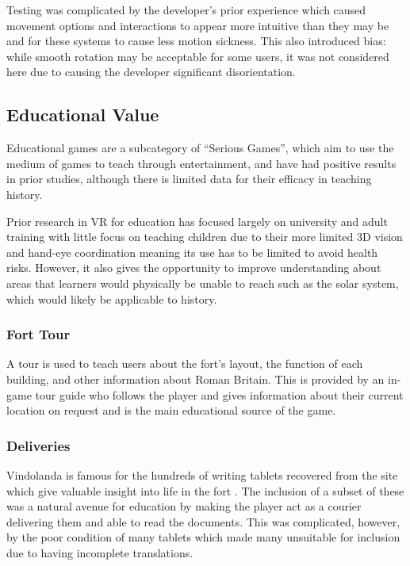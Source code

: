 \documentclass[sigconf]{acmart}
\begin{document}
Testing was complicated by the developer's prior experience which caused
movement options and interactions to appear more intuitive than they may be and
for these systems to cause less motion sickness. This also introduced bias:
while smooth rotation may be acceptable for some users, it was not considered
here due to causing the developer significant disorientation.


\subsection{Educational Value}
Educational games are a subcategory of ``Serious Games'', which aim to use the
medium of games to teach through entertainment, and have had positive results in
prior studies, although there is limited data for their efficacy in teaching
history. \cite{backlund_educational_2013}

Prior research in VR for education has focused largely on university and adult
training with little focus on teaching children due to their more limited 3D
vision and hand-eye coordination meaning its use has to be limited to avoid
health risks. \cite{freina_literature_2015} However, it
also gives the opportunity to improve understanding about areas that
learners would physically be unable to reach such as the solar system, which
would likely be applicable to history. \cite{detlefsen_cosmic_2014}

\subsubsection{Fort Tour}

A tour is used to teach users about the fort's layout, the function of each building,
and other information about Roman Britain. This is provided by an in-game tour guide who
follows the player and gives information about their current location on request and
is the main educational source of the game.

\subsubsection{Deliveries}

Vindolanda is famous for the hundreds of writing tablets recovered from the site
which give valuable insight into life in the fort \cite{adams_new_2003,coles_vindolanda_1985}.
The inclusion of a subset of these was a natural avenue for education by making
the player act as a courier delivering them and able to read the documents. This
was complicated, however, by the poor condition of many tablets which made many
unsuitable for inclusion due to having incomplete translations.
\end{document}

